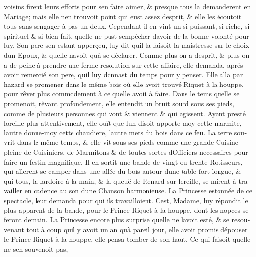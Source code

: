 \documentclass[14pt,a4paper]{memoir}
\begin{document}
{{\begin{otherlanguage}{french}
voisins firent leurs efforts pour s\textquotesingle en faire aimer, \&
presque tous la demanderent en Mariage; mais elle n\textquotesingle en
trouvoit point qui eust assez d\textquotesingle esprit, \& elle les
écoutoit tous sans s\textquotesingle engager à pas un
d\textquotesingle eux. Cependant il en vint un si puissant, si riche, si
spirituel \& si bien fait, qu\textquotesingle elle ne pust
s\textquotesingle empêcher d\textquotesingle avoir de la bonne volonté
pour luy. Son pere s\textquotesingle en estant apperçeu, luy dit
qu\textquotesingle il la faisoit la maistresse sur le choix
d\textquotesingle un Epoux, \& qu\textquotesingle elle
n\textquotesingle avoit qu\textquotesingle à se déclarer. Comme plus on
a d\textquotesingle esprit, \& plus on a de peine à prendre une ferme
resolution sur cette affaire, elle demanda, aprés avoir remercié son
pere, qu\textquotesingle il luy donnast du temps pour y penser. Elle
alla par hazard se promener dans le même bois où elle avoit trouvé
Riquet à la houppe, pour rêver plus commodement à ce
qu\textquotesingle elle avoit à faire. Dans le tems
qu\textquotesingle elle se promenoit, rêvant profondement, elle entendit
un bruit sourd sous ses pieds, comme de plusieurs personnes qui vont \&
viennent \& qui agissent. Ayant presté l\textquotesingle oreille plus
attentivement, elle ouït que l\textquotesingle un disoit apporte-moy
cette marmite, l\textquotesingle autre donne-moy cette chaudiere,
l\textquotesingle autre mets du bois dans ce feu. La terre
s\textquotesingle ouvrit dans le même temps, \& elle vit sous ses pieds
comme une grande Cuisine pleine de Cuisiniers, de Marmitons \& de toutes
sortes d\textquotesingle Officiers necessaires pour faire un festin
magnifique. Il en sortit une bande de vingt ou trente Rotisseurs, qui
allerent se camper dans une allée du bois autour d\textquotesingle une
table fort longue, \& qui tous, la lardoire à la main, \& la queuë de
Renard sur l\textquotesingle oreille, se mirent à travailler en cadence
au son d\textquotesingle une Chanson harmonieuse. La Princesse estonnée
de ce spectacle, leur demanda pour qui ils travailloient.
C\textquotesingle est, Madame, luy répondit le plus apparent de la
bande, pour le Prince Riquet à la houppe, dont les nopces se feront
demain. La Princesse encore plus surprise qu\textquotesingle elle ne
l\textquotesingle avoit esté, \& se resouvenant tout à coup
qu\textquotesingle il y avoit un an qu\textquotesingle à pareil jour,
elle avoit promis d\textquotesingle épouser le Prince Riquet à la
houppe, elle pensa tomber de son haut. Ce qui faisoit
qu\textquotesingle elle ne s\textquotesingle en souvenoit pas,

\end{otherlanguage}}}
\end{document}
